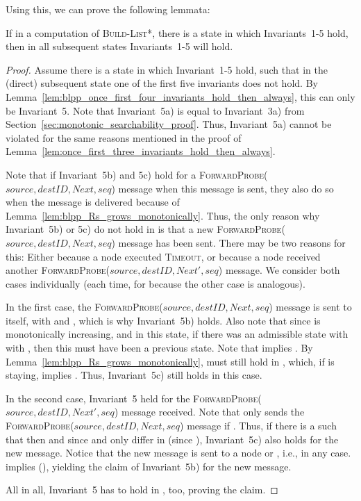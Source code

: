 \documentclass[a4paper,USenglish]{lipics}
\newcommand{\blpp}{\textsc{Build-List*}\xspace}
\newcommand{\timeout}{\textsc{Timeout}\xspace}
\newcommand{\forwardprobe}[1]{\textsc{ForwardProbe(\ensuremath{#1})}\xspace}
\begin{document}
Using this, we can prove the following lemmata:
\begin{lemma}\label{lem:blpp_once_first_five_invariants_hold_then_always}
 If in a computation of \blpp, there is a state in which Invariants~1-5 hold, then in all subsequent states Invariants~1-5 will hold.
\end{lemma}
\begin{proof}
 Assume there is a state  in which Invariant~1-5 hold, such that in the (direct) subsequent state  one of the first five invariants does not hold.
 By Lemma~\ref{lem:blpp_once_first_four_invariants_hold_then_always}, this can only be Invariant~5.
 Note that Invariant~5a) is equal to Invariant~3a) from Section~\ref{sec:monotonic_searchability_proof}.
 Thus, Invariant~5a) cannot be violated for the same reasons mentioned in the proof of Lemma~\ref{lem:once_first_three_invariants_hold_then_always}.

 Note that if Invariant~5b) and 5c) hold for a \forwardprobe{source,destID,Next,seq} message when this message is sent, they also do so when the message is delivered because of Lemma~\ref{lem:blpp_Rs_grows_monotonically}.
 Thus, the only reason why Invariant~5b) or 5c) do not hold in  is that a new \forwardprobe{source,destID,Next,seq} message has been sent.
 There may be two reasons for this:
 Either because a node  executed \timeout, or because a node  received another \forwardprobe{source,destID,Next',seq} message.
 We consider both cases individually (each time, for  because the other case is analogous).
 
 In the first case, the \forwardprobe{source,destID,Next,seq} message is sent to  itself, with  and , which is why Invariant~5b) holds.
 Also note that since  is monotonically increasing, and  in this state, if there was an admissible state with  with , then this must have been a previous state.
 Note that  implies .
 By Lemma~\ref{lem:blpp_Rs_grows_monotonically},  must still hold in , which, if  is staying, implies .
 Thus, Invariant~5c) still holds in this case.
 
 In the second case, Invariant~5 held for the \forwardprobe{source,destID,Next',seq} message  received.
 Note that  only sends the \forwardprobe{source,destID,Next,seq} message if .
 Thus, if there is a  such that  then  and since  and  only differ in  (since ), Invariant~5c) also holds for the new message. 
 Notice that the new message is sent to a node  or , i.e.,  in any case.
  implies  (), yielding the claim of Invariant~5b) for the new message.
 
 All in all, Invariant~5 has to hold in , too, proving the claim.
\end{proof}
\end{document}
